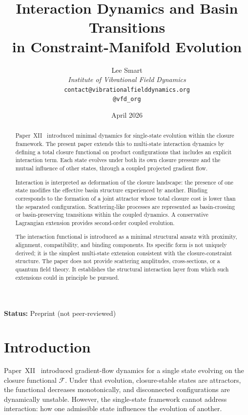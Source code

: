 \documentclass[12pt]{article}
\title{Interaction Dynamics and Basin Transitions\\in Constraint-Manifold Evolution}
\author{%
  Lee Smart\\[4pt]
  \textit{Institute of Vibrational Field Dynamics}\\[2pt]
  \texttt{contact@vibrationalfielddynamics.org}\\[2pt]
  \texttt{@vfd\_org}%
}
\date{April 2026}
\newcommand{\Fcal}{\mathcal{F}}
\begin{document}
\maketitle

\noindent\textbf{Status:} Preprint (not peer-reviewed)

\begin{abstract}
Paper~XII~\citep{SmartXII} introduced minimal dynamics for single-state evolution within the closure framework. The present paper extends this to multi-state interaction dynamics by defining a total closure functional on product configurations that includes an explicit interaction term. Each state evolves under both its own closure pressure and the mutual influence of other states, through a coupled projected gradient flow.

Interaction is interpreted as deformation of the closure landscape: the presence of one state modifies the effective basin structure experienced by another. Binding corresponds to the formation of a joint attractor whose total closure cost is lower than the separated configuration. Scattering-like processes are represented as basin-crossing or basin-preserving transitions within the coupled dynamics. A conservative Lagrangian extension provides second-order coupled evolution.

The interaction functional is introduced as a minimal structural ansatz with proximity, alignment, compatibility, and binding components. Its specific form is not uniquely derived; it is the simplest multi-state extension consistent with the closure-constraint structure. The paper does not provide scattering amplitudes, cross-sections, or a quantum field theory. It establishes the structural interaction layer from which such extensions could in principle be pursued.
\end{abstract}

\section{Introduction}\label{sec:intro}

Paper~XII~\citep{SmartXII} introduced gradient-flow dynamics for a single state evolving on the closure functional $\Fcal$. Under that evolution, closure-stable states are attractors, the functional decreases monotonically, and disconnected configurations are dynamically unstable. However, the single-state framework cannot address interaction: how one admissible state influences the evolution of another.
\end{document}

